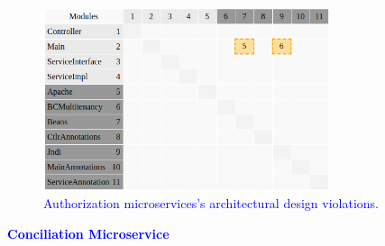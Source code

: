 \documentclass[12pt]{article}
\begin{document}
\begin{figure}[ht]
\centering
\includegraphics[width=0.75\textwidth]{figuras/violacoesAuthorization.png}
\caption{\textcolor{blue}{Authorization microservices's architectural design violations.}}
\label{fig:microservices}
\end{figure}

\newpage
\noindent\textbf{\textcolor{blue}{Conciliation Microservice}}
\label{sec:ApendiceConciliation}
\end{document}
